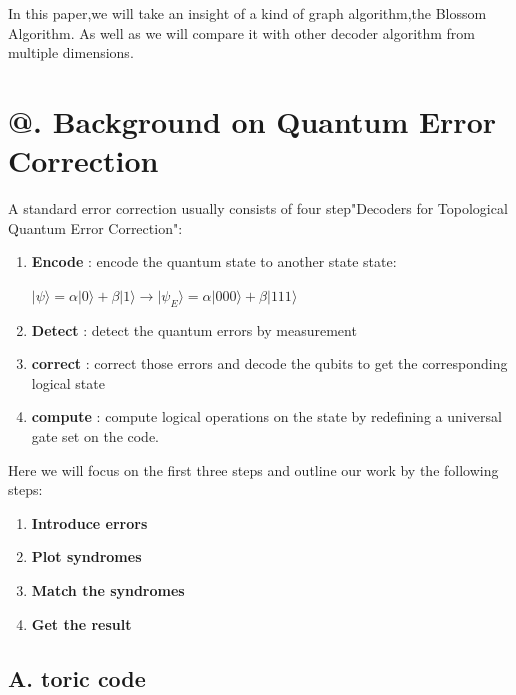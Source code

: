 \documentclass[
	a4paper, %
	10pt, %
	unnumberedsections, %
	twoside, %
]{LTJournalArticle}
\makeatletter
\newcommand{\Rmnum}[1]{\expandafter\@slowromancap\romannumeral #1@}
\makeatother
\begin{document}
In this paper,we will take an insight of a kind of graph algorithm,the Blossom Algorithm. As well as we will compare it with other decoder algorithm from multiple dimensions.



\section{\Rmnum{2}. Background on Quantum Error Correction}

A standard error correction usually consists of four step"Decoders for Topological Quantum Error Correction":
\begin{enumerate}
	\item \textbf{Encode} : encode the quantum state to another state state:
	\begin{center}
	$\vert \psi \rangle= \alpha \vert 0 \rangle +\beta \vert 1 \rangle \rightarrow \vert \psi_{E} \rangle=\alpha \vert 000 \rangle +\beta \vert 111 \rangle$
	\end{center} 
	\item \textbf{Detect} : detect the quantum errors by measurement
	\item \textbf{correct} : correct those errors and decode the qubits to get the corresponding logical state
	\item \textbf{compute} : compute logical operations on the state by redefining a universal gate set on the code.
\end{enumerate}
Here we will focus on the first three steps and outline our work by the following steps:
\begin{enumerate}
	\item \textbf{Introduce errors}
	\item \textbf{Plot syndromes}
	\item \textbf{Match the syndromes}
	\item \textbf{Get the result}
\end{enumerate}

\subsection{A. toric code}
\end{document}
